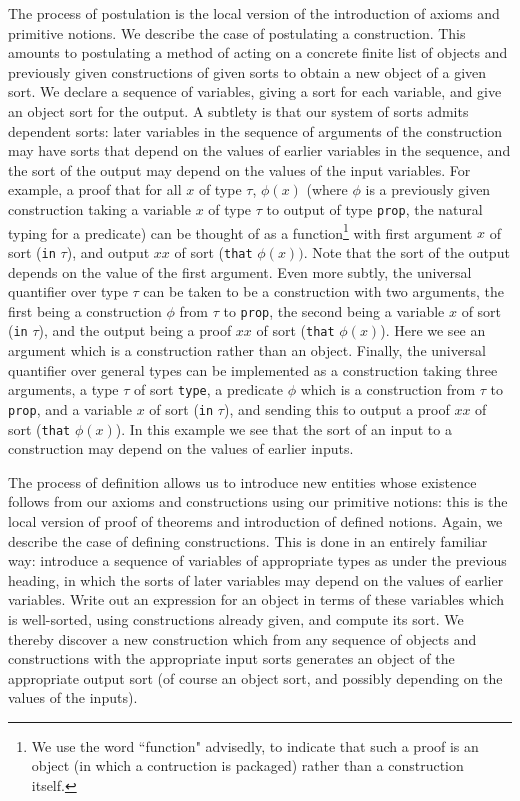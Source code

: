 \documentclass[12pt]{article}
\begin{document}
The process of postulation is the local version of the introduction of axioms and primitive notions.  We describe the case of postulating a construction.  This amounts to postulating a method of acting on a concrete finite list of objects and previously given constructions of given
sorts to obtain a new object of a given sort.  We declare a sequence of variables, giving a sort for each variable, and give an object sort for the output.  A subtlety is that our system of sorts admits dependent sorts:  later variables in the sequence of arguments of the construction may have sorts that depend on the values of  earlier variables in the sequence,  and the sort of the output may depend on the values of the input variables.  For example,
a proof that for all $x$ of type $\tau$, $\phi(x)$ (where $\phi$ is a previously given construction taking a variable $x$ of type $\tau$ to output of type {\tt prop}, the natural typing for a predicate) can be thought of as a function\footnote{We use the word ``function" advisedly, to indicate that such a proof is an object (in which a contruction is packaged) rather than a construction itself.} with first argument $x$ of sort ({\tt in} $\tau$), and output $xx$ of sort ({\tt that} $\phi(x))$.  Note that the sort of the output depends on the value of the first argument.  Even more subtly, the universal quantifier over type $\tau$ can be taken to be a construction with two arguments, the first being a construction $\phi$ from
$\tau$ to {\tt prop}, the second being a variable $x$ of sort ({\tt in}  $\tau$), and the output being a proof $xx$ of sort ({\tt that} $\phi(x)$).   Here we see an argument which is a construction rather than an object.   Finally, the universal quantifier over general types can be implemented as a construction taking three arguments, a type $\tau$ of sort {\tt type},
a predicate $\phi$  which is a construction from $\tau$ to {\tt prop}, and a variable $x$ of sort ({\tt in} $\tau$), and sending this to output a proof $xx$ of sort ({\tt that} $\phi(x)$).
In this example we see that the sort of an input to a construction may depend on the values of earlier inputs.

The process of definition allows us to introduce new entities whose existence follows from our axioms and constructions using our primitive notions:   this is the local version of proof of theorems and introduction of defined notions. Again, we describe the case of defining constructions.  This is done in an entirely familiar way:
introduce a sequence of variables of appropriate types as under the previous heading, in which the sorts of later variables may depend on the values of earlier variables.   Write out an expression  for an object in terms of these variables which is well-sorted, using constructions
already given, and compute its sort.  We thereby discover a new construction which from any sequence of objects and constructions with the appropriate input sorts generates an object of the appropriate output sort (of course an object sort, and possibly depending on the values of the inputs).
\end{document}
